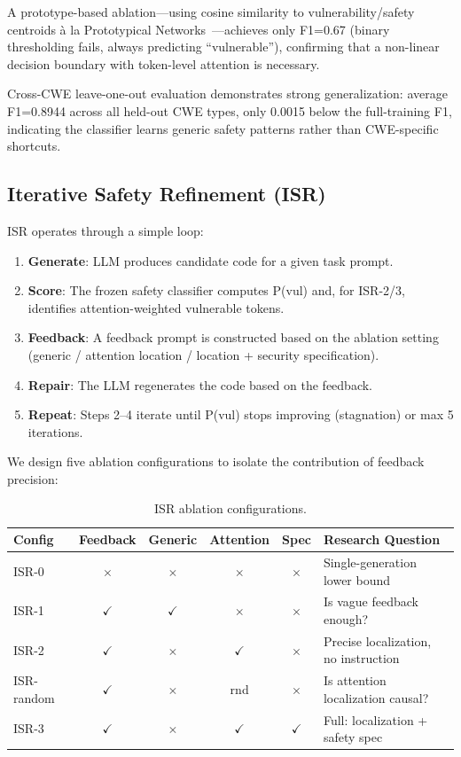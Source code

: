\documentclass[10pt,conference]{IEEEtran}
\begin{document}
A prototype-based ablation---using cosine similarity to vulnerability/safety centroids \`{a} la Prototypical Networks~\cite{protonet}---achieves only F1=0.67 (binary thresholding fails, always predicting ``vulnerable''), confirming that a non-linear decision boundary with token-level attention is necessary.

Cross-CWE leave-one-out evaluation demonstrates strong generalization: average F1=0.8944 across all held-out CWE types, only 0.0015 below the full-training F1, indicating the classifier learns generic safety patterns rather than CWE-specific shortcuts.

\subsection{Iterative Safety Refinement (ISR)}

ISR operates through a simple loop:

\begin{enumerate}
\item \textbf{Generate}: LLM produces candidate code for a given task prompt.
\item \textbf{Score}: The frozen safety classifier computes P(vul) and, for ISR-2/3, identifies attention-weighted vulnerable tokens.
\item \textbf{Feedback}: A feedback prompt is constructed based on the ablation setting (generic / attention location / location + security specification).
\item \textbf{Repair}: The LLM regenerates the code based on the feedback.
\item \textbf{Repeat}: Steps 2--4 iterate until P(vul) stops improving (stagnation) or max 5 iterations.
\end{enumerate}

We design five ablation configurations to isolate the contribution of feedback precision:

\begin{table}
\centering
\caption{ISR ablation configurations.}
\begin{tabular}{lccccp{3.5cm}}
\toprule
Config & Feedback & Generic & Attention & Spec & Research Question \\
\midrule
ISR-0 & $\times$ & $\times$ & $\times$ & $\times$ & Single-generation lower bound \\
ISR-1 & $\checkmark$ & $\checkmark$ & $\times$ & $\times$ & Is vague feedback enough? \\
ISR-2 & $\checkmark$ & $\times$ & $\checkmark$ & $\times$ & Precise localization, no instruction \\
ISR-random & $\checkmark$ & $\times$ & rnd & $\times$ & Is attention localization causal? \\
ISR-3 & $\checkmark$ & $\times$ & $\checkmark$ & $\checkmark$ & Full: localization + safety spec \\
\bottomrule
\end{tabular}
\end{table}
\end{document}
